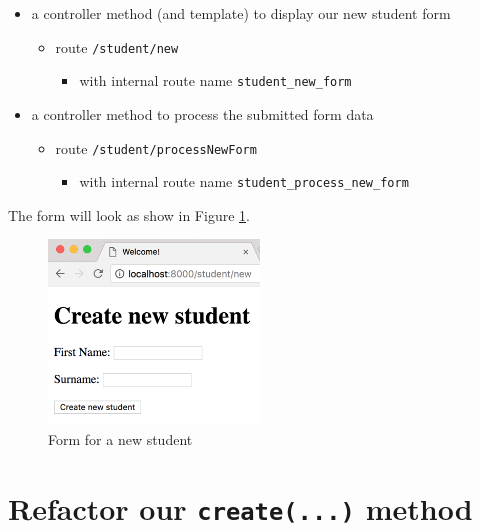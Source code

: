 \documentclass[a4paperpaper,openright]{book}
\providecommand{\tightlist}{%
  \setlength{\itemsep}{0pt}\setlength{\parskip}{0pt}}
\begin{document}
\begin{itemize}
\item
  a controller method (and template) to display our new student form

  \begin{itemize}
  \item
    route \texttt{/student/new}

    \begin{itemize}
    \tightlist
    \item
      with internal route name \texttt{student\_new\_form}
    \end{itemize}
  \end{itemize}
\item
  a controller method to process the submitted form data

  \begin{itemize}
  \item
    route \texttt{/student/processNewForm}

    \begin{itemize}
    \tightlist
    \item
      with internal route name \texttt{student\_process\_new\_form}
    \end{itemize}
  \end{itemize}
\end{itemize}

The form will look as show in Figure \ref{new_student_form}.

\begin{figure}
\centering
\includegraphics[width=0.5\textwidth,height=\textheight]{./tex2pdf.-8a1528da847c818a/47fb9483958661b9823335391996ce0741d76a07.png}
\caption{Form for a new student \label{new_student_form}}
\end{figure}

\hypertarget{refactor-our-create...-method}{%
\section{\texorpdfstring{Refactor our \texttt{create(...)}
method}{Refactor our create(...) method}}\label{refactor-our-create...-method}}
\end{document}
